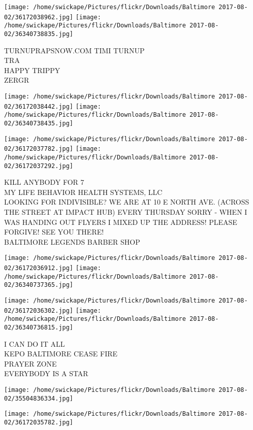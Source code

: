 \documentclass[10pt,letterpaper]{article}
\begin{document}
\texttt{[image: /home/swickape/Pictures/flickr/Downloads/Baltimore 2017-08-02/36172038962.jpg]}
\texttt{[image: /home/swickape/Pictures/flickr/Downloads/Baltimore 2017-08-02/36340738835.jpg]}

TURNUPRAPSNOW.COM TIMI TURNUP\\
TRA\\
HAPPY TRIPPY\\
ZERGR
\pagebreak

\texttt{[image: /home/swickape/Pictures/flickr/Downloads/Baltimore 2017-08-02/36172038442.jpg]}
\texttt{[image: /home/swickape/Pictures/flickr/Downloads/Baltimore 2017-08-02/36340738435.jpg]}

\texttt{[image: /home/swickape/Pictures/flickr/Downloads/Baltimore 2017-08-02/36172037782.jpg]}
\texttt{[image: /home/swickape/Pictures/flickr/Downloads/Baltimore 2017-08-02/36172037292.jpg]}

KILL ANYBODY FOR 7\\
MY LIFE BEHAVIOR HEALTH SYSTEMS, LLC\\
LOOKING FOR INDIVISIBLE?  WE ARE AT 10 E NORTH AVE. (ACROSS THE STREET AT IMPACT HUB) EVERY THURSDAY SORRY  {-} WHEN I WAS HANDING OUT FLYERS I MIXED UP THE ADDRESS!  PLEASE FORGIVE!  SEE YOU THERE!\\
BALTIMORE LEGENDS BARBER SHOP
\pagebreak

\texttt{[image: /home/swickape/Pictures/flickr/Downloads/Baltimore 2017-08-02/36172036912.jpg]}
\texttt{[image: /home/swickape/Pictures/flickr/Downloads/Baltimore 2017-08-02/36340737365.jpg]}

\texttt{[image: /home/swickape/Pictures/flickr/Downloads/Baltimore 2017-08-02/36172036302.jpg]}
\texttt{[image: /home/swickape/Pictures/flickr/Downloads/Baltimore 2017-08-02/36340736815.jpg]}

I CAN DO IT ALL\\
KEPO BALTIMORE CEASE FIRE\\
PRAYER ZONE\\
EVERYBODY IS A STAR
\pagebreak

\texttt{[image: /home/swickape/Pictures/flickr/Downloads/Baltimore 2017-08-02/35504836334.jpg]}

\vspace{0.25in}
\texttt{[image: /home/swickape/Pictures/flickr/Downloads/Baltimore 2017-08-02/36172035782.jpg]}
\end{document}
